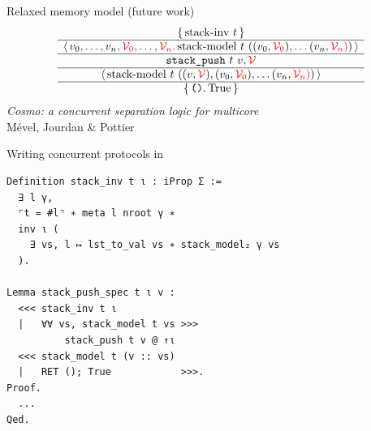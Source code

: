 \begin{frame}{Relaxed memory model (future work)}
\centering
\large
\[
    \begin{array}{c} \left\lbrace\, 
      \mathrm{stack {\hbox{-}} inv}\ t
     \,\right\rbrace \\ \hline \left\langle\, 
      v_0, \dots, v_n, \textcolor{red}{\mathcal{V}_0}, \dots, \textcolor{red}{\mathcal{V}_n}
     \ldotp 
      \mathrm{stack {\hbox{-}} model}\ t\ ((v_0, \textcolor{red}{\mathcal{V}_0}), \dots (v_n, \textcolor{red}{\mathcal{V}_n)})
     \,\right\rangle \\ \hline 
      \texttt{stack\_push}\ t\ v, \textcolor{red}{\mathcal{V}}
     \\ \hline \left\langle\, 
      \mathrm{stack {\hbox{-}} model}\ t\ ((v, \textcolor{red}{\mathcal{V}}), (v_0, \textcolor{red}{\mathcal{V}_0}), \dots (v_n, \textcolor{red}{\mathcal{V}_n)})
     \,\right\rangle \\ \hline \left\lbrace\, 
      \texttt{()}
     \ldotp 
      \mathrm{True}
     \,\right\rbrace \end{array}
\]
\vfill
\normalsize
\emph{Cosmo: a concurrent separation logic for multicore \OCaml} \\
Mével, Jourdan \& Pottier
\end{frame}

\begin{frame}[fragile]{Writing concurrent protocols in \Iris}
\small
\begin{verbatim}
Definition stack_inv t ι : iProp Σ :=
  ∃ l γ,
  ⌜t = #l⌝ ∗ meta l nroot γ ∗
  inv ι (
    ∃ vs, l ↦ lst_to_val vs ∗ stack_model₂ γ vs
  ).

Lemma stack_push_spec t ι v :
  <<< stack_inv t ι
  |   ∀∀ vs, stack_model t vs >>>
          stack_push t v @ ↑ι
  <<< stack_model t (v :: vs)
  |   RET (); True            >>>.
Proof.
  ...
Qed.
\end{verbatim}
\end{frame}